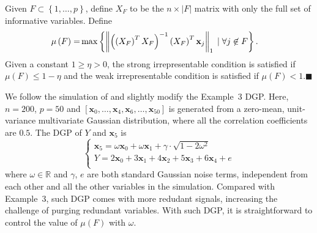 \documentclass[12pt]{article}
\begin{document}
\begin{definition}[IRC]
  Given $F \subset \left\{ 1, \ldots, p \right\}$, define $X_F$ to be the $n \times \left\vert F \right \vert$ matrix with only the full set of informative variables. Define
    \begin{align}
    \mu \left( F \right) = & \max \left\{ \left\Vert \left( \left( X_F \right)^T X_F \right)^{-1} \left( X_F \right)^T \mathbf{x}_j \right\Vert_1 \; \vert \; \forall j \not\in F \right\}. \notag
    \end{align}
  Given a constant $1 \geqslant \eta > 0$, the strong irrepresentable condition is satisfied if $\mu \left( F \right) \leqslant 1 - \eta$ and the weak irrepresentable condition is satisfied if $\mu \left( F \right) < 1$.$\blacksquare$
\end{definition}

\smallskip
We follow the simulation of \citet{zhaoyu06} and slightly modify the Example~3 DGP. Here, $n = 200$, $p = 50$ and $[\mathbf{x}_0, \ldots, \mathbf{x}_4, \mathbf{x}_6, \ldots, \mathbf{x}_{50}]$ is generated from a zero-mean, unit-variance multivariate Gaussian distribution, where all the correlation coefficients are $0.5$. The DGP of $Y$ and $\mathbf{x}_5$ is
\begin{equation}
	\begin{cases}
    \mathbf{x}_5 = \omega \mathbf{x}_0 + \omega \mathbf{x}_1 + \gamma\cdot \sqrt{1 - 2\omega^2} \\
    Y = 2 \mathbf{x}_0 + 3\mathbf{x}_1 + 4 \mathbf{x}_2 + 5 \mathbf{x}_3 + 6 \mathbf{x}_4 + e \\
	\end{cases}
	\label{eqn:dgp_x5}
\end{equation}
%
where $\omega \in \mathbb{R}$ and $\gamma$, $e$ are both standard Gaussian noise terms, independent from each other and all the other variables in the simulation. Compared with Example~3, such DGP comes with more redudant signals, increasing the challenge of purging redundant variables. With such DGP, it is straightforward to control the value of $\mu \left( F \right)$ with $\omega$.  
\end{document}
